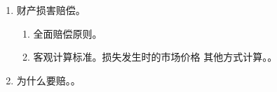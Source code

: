 \begin{enumerate}
\begin{enumerate}
\begin{enumerate}
\begin{enumerate}
                        \end{enumerate}
                  \item 原则不可以继承。例外。\yi 已起诉。\er 已书面承诺给予赔偿。
                \end{enumerate}
        \end{enumerate}
  \item 财产损害赔偿。
        \begin{enumerate}
          \item 全面赔偿原则。
          \item 客观计算标准。损失发生时的市场价格 \hz 其他方式计算。。
        \end{enumerate}
  \item 为什么要赔。。
\end{enumerate}
